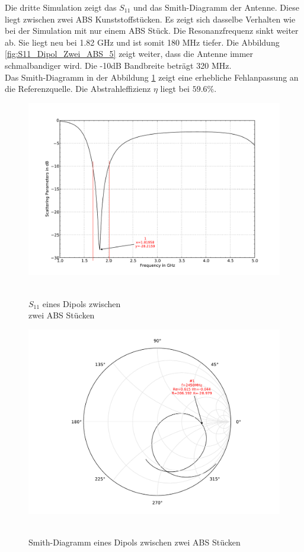 Die dritte Simulation zeigt das $S_{11}$ und das Smith-Diagramm der Antenne. Diese liegt zwischen zwei ABS Kunststoffstücken. Es zeigt sich dasselbe Verhalten wie bei der Simulation mit nur einem ABS Stück. Die Resonanzfrequenz sinkt weiter ab. Sie liegt neu bei 1.82 GHz und ist somit 180 MHz tiefer. Die Abbildung  \ref{fig:S11_Dipol_Zwei_ABS_5} zeigt weiter, dass die Antenne immer schmalbandiger wird. Die -10dB Bandbreite beträgt 320 MHz.\\
Das Smith-Diagramm in der Abbildung \ref{fig:Smith_Dipol_Zwei_ABS_6} zeigt eine erhebliche Fehlanpassung an die Referenzquelle. Die Abstrahleffizienz $\eta$ liegt  bei $59.6 \%$.

\begin{figure}[!h]
\begin{center}
  \includegraphics[width=\linewidth]{content/bilder/Evaluation/Dipol/S11DipolZweiABS.pdf}
  \caption{\\$S_{11}$ eines Dipols zwischen \\zwei ABS Stücken}\label{fig:S11_Dipol_Zwei_ABS_5}
\endminipage%
{}
  \includegraphics[width=\linewidth]{content/bilder/Evaluation/Dipol/SmithDipolZweiABS.pdf}
  \caption{\\Smith-Diagramm eines Dipols zwischen zwei ABS Stücken}\label{fig:Smith_Dipol_Zwei_ABS_6}
\endminipage
\end{center}
\end{figure}

